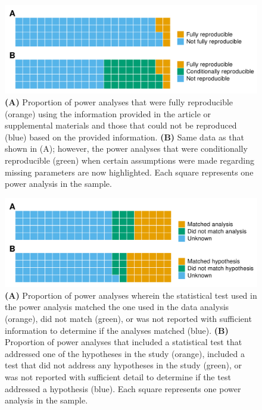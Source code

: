 \documentclass[
  man, donotrepeattitle,mask,floatsintext]{apa7}
\begin{document}
\clearpage

\begin{figure}

{\centering \includegraphics{../../figs/fig1} 

}

\caption{\normalfont
\textbf{(A)} Proportion of power analyses that were fully reproducible (orange) using the information provided in the article or supplemental materials and those that could not be reproduced (blue) based on the provided information. \textbf{(B)} Same data as that shown in (A); however, the power analyses that were conditionally reproducible (green) when certain assumptions were made regarding missing parameters are now highlighted. Each square represents one power analysis in the sample.}\label{fig:fig1}
\end{figure}




\clearpage

\begin{figure}

{\centering \includegraphics{../../figs/fig2} 

}

\caption{\normalfont
\textbf{(A)} Proportion of power analyses wherein the statistical test used in the power analysis matched the one used in the data analysis (orange), did not match (green), or was not reported with sufficient information to determine if the analyses matched (blue). \textbf{(B)} Proportion of power analyses that included a statistical test that addressed one of the hypotheses in the study (orange), included a test that did not address any hypotheses in the study (green), or was not reported with sufficient detail to determine if the test addressed a hypothesis (blue). Each square represents one power analysis in the sample.}\label{fig:fig2}
\end{figure}
\end{document}
